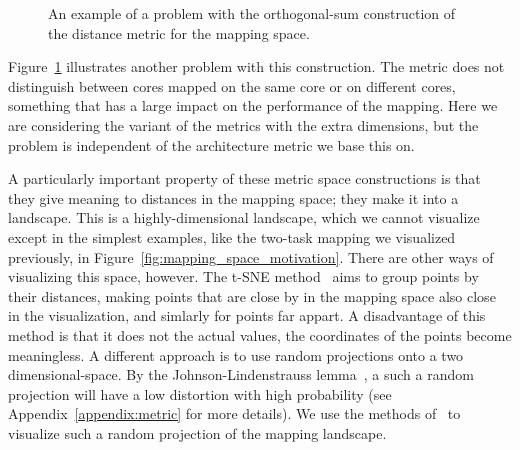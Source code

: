 \begin{figure}[h]
	\centering
   \resizebox{0.85\textwidth}{!}{
	   \begin{tikzpicture}
	   
	   \end{tikzpicture}
	   }
	\caption{An example of a problem with the orthogonal-sum construction of the distance metric for the mapping space.}
	\label{fig:distance_tasks_problem}
\end{figure}

Figure~\ref{fig:distance_tasks_problem} illustrates another problem with this construction.
The metric does not distinguish between cores mapped on the same core or on different cores, something that has a large impact on the performance of the mapping.
Here we are considering the variant of the metrics with the extra dimensions, but the problem is independent of the architecture metric we base this on.

A particularly important property of these metric space constructions is that they give meaning to distances in the mapping space; they make it into a landscape.
This is a highly-dimensional landscape, which we cannot visualize except in the simplest examples, like the two-task mapping we visualized previously, in Figure~\ref{fig:mapping_space_motivation}.
There are other ways of visualizing this space, however.
The t-SNE method~\cite{tsne} aims to group points by their distances, making points that are close by in the mapping space also close in the visualization, and simlarly for points far appart.
A disadvantage of this method is that it does not the actual values, the coordinates of the points become meaningless.
A different approach is to use random projections onto a two dimensional-space.
By the Johnson-Lindenstrauss lemma~\cite{johnson_lindenstrauss}, a such a random projection will have a low distortion with high probability (see Appendix~\ref{appendix:metric} for more details).
We use the methods of~\cite{visualloss} to visualize such a random projection of the mapping landscape.

